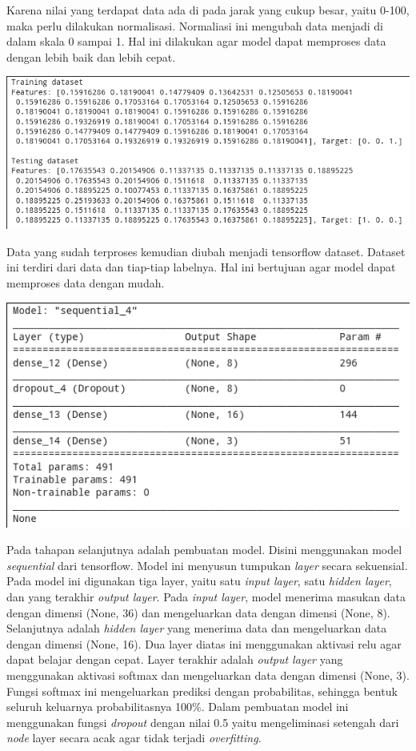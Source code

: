 \documentclass[12pt, a4paper]{article}
\begin{document}
\begin{multicols}{2}
\justifying
Karena nilai yang terdapat data ada di pada jarak yang cukup besar, yaitu 0-100, maka perlu dilakukan normalisasi. Normaliasi ini mengubah data menjadi di dalam skala 0 sampai 1. Hal ini dilakukan agar model dapat memproses data dengan lebih baik dan lebih cepat. \cite{tensorflow2015-whitepaper}

\centering
\vspace{0.2cm}
\includegraphics[scale=0.26]{dataset}
\vspace{0.2cm}

\justifying
Data yang sudah terproses kemudian diubah menjadi tensorflow dataset. Dataset ini terdiri dari data dan tiap-tiap labelnya. Hal ini bertujuan agar model dapat memproses data dengan mudah.

\centering
\vspace{0.2cm}
\includegraphics[scale=0.31]{model}
\vspace{0.2cm}

\justifying
Pada tahapan selanjutnya adalah pembuatan model. Disini menggunakan model \textit{sequential} dari tensorflow. Model ini menyusun tumpukan \textit{layer} secara sekuensial. Pada model ini digunakan tiga layer, yaitu satu \textit{input layer}, satu \textit{hidden layer}, dan yang terakhir \textit{output layer}. Pada \textit{input layer}, model menerima masukan data dengan dimensi (None, 36) dan mengeluarkan data dengan dimensi (None, 8). Selanjutnya adalah \textit{hidden layer} yang
menerima data dan mengeluarkan data dengan dimensi (None, 16). Dua layer diatas ini menggunakan aktivasi relu agar dapat belajar dengan cepat. Layer terakhir adalah \textit{output layer} yang menggunakan aktivasi softmax  dan mengeluarkan data dengan dimensi (None, 3). Fungsi softmax ini mengeluarkan prediksi dengan probabilitas, sehingga bentuk seluruh keluarnya probabilitasnya 100\%. Dalam pembuatan model ini menggunakan fungsi \textit{dropout} dengan nilai 0.5 yaitu mengeliminasi setengah
dari \textit{node} layer secara acak agar tidak terjadi \textit{overfitting}. 


\end{multicols}
\end{document}

